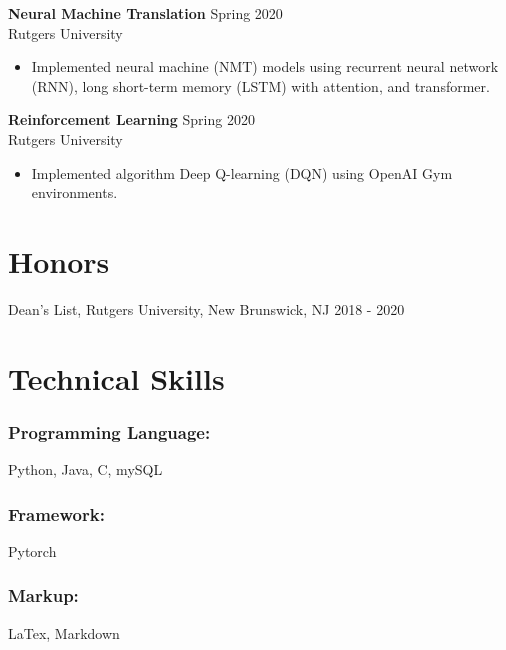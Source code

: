 \documentclass{article}
\begin{document}
\noindent \textbf{Neural Machine Translation}
\hfill{Spring 2020}\\
Rutgers University
\begin{itemize}
  \itemsep0em
  \item Implemented neural machine (NMT) models using recurrent neural network (RNN), long short-term memory (LSTM) with attention, and transformer.
\end{itemize}

\noindent \textbf{Reinforcement Learning}
\hfill{Spring 2020}\\
Rutgers University
\begin{itemize}
  \itemsep0em
  \item Implemented algorithm Deep Q-learning (DQN) using OpenAI Gym environments.
\end{itemize}


\section{Honors}
Dean's List, Rutgers University, New Brunswick, NJ
\hfill{2018 - 2020}\\


\section{Technical Skills}

\subsubsection{Programming Language:}

Python, Java, C, mySQL

\subsubsection{Framework:}

Pytorch

\subsubsection{Markup:}

LaTex, Markdown
\end{document}
